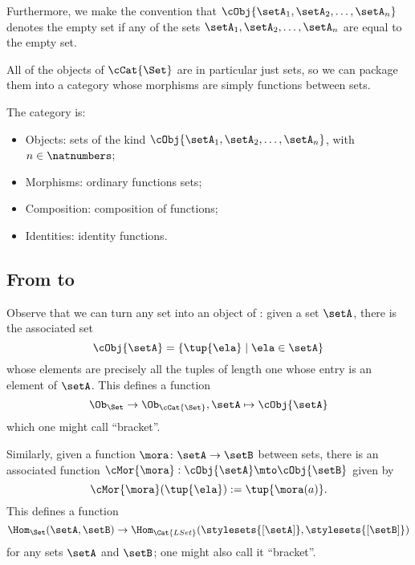 Furthermore, we make the convention that $ \cObj{\setA_1, \setA_2, \dots, \setA_n}$ denotes the empty set if any of the sets $\setA_1, \setA_2, \dots , \setA_n$ are equal to the empty set.

All of the objects of $\cCat{\Set}$ are in particular just sets, so we can package them into a category whose morphisms are simply functions between sets.

\begin{ctdefinition}[\cCat{\Set}]
    The category \cCat{\Set} is:

    \begin{itemize}
        \item Objects: sets of the kind $\cObj{\setA_1, \setA_2, \dots, \setA_n}$, with $n \in \natnumbers$; 
        \item Morphisms: ordinary functions sets;
        \item Composition: composition of functions;
        \item Identities: identity functions.
    \end{itemize}
\end{ctdefinition}

\subsection{From \Set to \cCat{\Set}}

Observe that we can turn any set into an object of \cCat{\Set}: given a set $\setA$, there is the associated set
\begin{equation}
\cObj{\setA} = \{ \tup{\ela} \mid \ela \in \setA \}
\end{equation}
whose elements are precisely all the tuples of length one whose entry is an element of $\setA$. This defines a function
\begin{equation}
\Ob_{\Set} \to \Ob_{\cCat{\Set}}, \setA \mapsto \cObj{\setA}
\end{equation}
which one might call ``bracket''.

Similarly, given a function $\mora \colon \setA \to \setB$ between sets, there is an associated function $\cMor{ \mora }: \cObj{\setA} \mto \cObj{\setB}$ given by
\begin{equation}
\cMor{ \mora } ( \tup{ \ela }) := \tup{\mora(a)}.
\end{equation}
This defines a function
\begin{equation}
\Hom_{\Set}(\setA,\setB) \to \Hom_{\Cat{LSet}}(\stylesets{[\setA]},\stylesets{[\setB]})
\end{equation}
for any sets $\setA$ and $\setB$; one might also call it ``bracket''.





